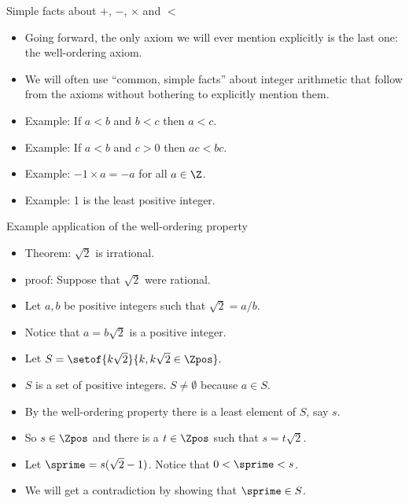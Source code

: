 \documentclass{beamer}
\begin{document}
\begin{frame}{Simple facts about $+$, $-$, $\times$ and $<$}

\begin{itemize}
  \item Going forward, the only axiom we will ever mention explicitly is the last one: the well-ordering axiom.
  \item We will often use ``common, simple facts'' about integer arithmetic that follow
  from the axioms without bothering to explicitly mention them.
  \item Example: If $a<b$ and $b<c$ then $a < c$.
  \item Example: If $a<b$ and $c>0$ then $ac < bc$.
  \item Example: $-1\times a = -a$ for all $a\in\Z$.
  \item Example: 1 is the least positive integer.
\end{itemize}

\end{frame}

\begin{frame}{Example application of the well-ordering property}

\begin{itemize}
  \item Theorem: $\sqrt{2}$ is irrational.
  \item proof: Suppose that $\sqrt{2}$ were rational.
  \item Let $a,b$ be positive integers such that $\sqrt{2}=a/b$.
  \item Notice that $a=b\sqrt{2}$ is a positive integer.
  \item Let $S=\setof{k\sqrt{2}}{k,k\sqrt{2}\in\Zpos}.$
  \item $S$ is a set of positive integers. $S\not=\emptyset$ because $a\in S$.
  \item By the well-ordering property there is a least element of $S$, say $s$.
  \item So $s\in\Zpos$ and there is a $t\in\Zpos$ such that $s=t\sqrt{2}$.
  \item Let $\sprime = s(\sqrt{2} - 1)$. Notice that $0< \sprime<s$.
  \item We will get a contradiction by showing that $\sprime\in S$.
\end{itemize}

\end{frame}
\end{document}
